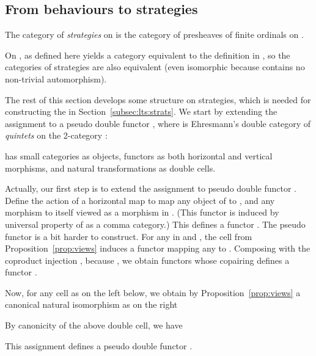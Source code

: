 \documentclass{LMCS}
\theoremstyle{plain}\newtheorem{satz}[thm]{Satz}
\begin{document}
\subsection{From behaviours to strategies}
   \begin{defi}
     The category  of \emph{strategies} on  is the category
      of presheaves of finite ordinals on .
   \end{defi}
   \begin{exa}
     On ,  as defined here yields a category equivalent
     to the definition in , so the
     categories of strategies are also equivalent (even isomorphic
     because  contains no non-trivial automorphism).
   \end{exa}
   The rest of this section develops some structure on strategies,
   which is needed for constructing the \lts{} in
   Section~\ref{subsec:lts:strats}. We start by extending the
   assignment  to a pseudo double functor , where  is Ehresmann's double category of
   \emph{quintets} on the 2-category :
   \begin{defi}
      has small categories as objects, functors as both
     horizontal and vertical morphisms, and natural transformations as
     double cells.
   \end{defi}

   Actually, our first step is to extend the assignment 
   to pseudo double functor .  Define the action
   of a horizontal map  to map any object 
   of  to , and any morphism to itself viewed
   as a morphism in . (This functor is induced by universal
   property of  as a comma category.) This defines a functor
   .  The pseudo functor 
   is a bit harder to construct. For any  in
    and , the cell  from
   Proposition~\ref{prop:views} induces a functor  mapping any  to .  Composing with the coproduct injection
   , because , we obtain functors  whose copairing defines a functor .


   Now, for any cell as on the left below,
   we obtain by Proposition~\ref{prop:views} a canonical natural isomorphism as on the right
     By canonicity of the above double cell, we have
   \begin{prop}\label{prop:pseudodoublefunctor}
     This assignment defines a pseudo double functor .
   \end{prop}
\end{document}
